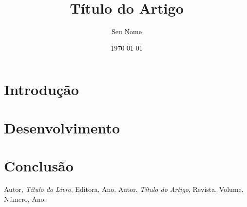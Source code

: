 \documentclass[a4paper,12pt]{article}
\title{Título do Artigo}
\author{Seu Nome}
\date{\today}
\begin{document}
\maketitle
\begin{abstract}
\lipsum[1]
\end{abstract}

\tableofcontents
\newpage

\section{Introdução}
\lipsum[2-3]

\section{Desenvolvimento}
\lipsum[4-6]

\section{Conclusão}
\lipsum[7]

\begin{thebibliography}{9}
 Autor, \textit{Título do Livro}, Editora, Ano.
 Autor, \textit{Título do Artigo}, Revista, Volume, Número, Ano.
\end{thebibliography}
\end{document}
